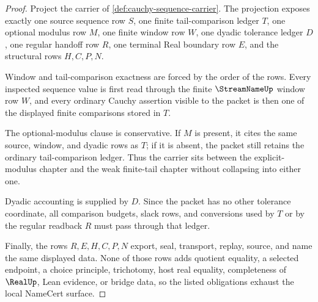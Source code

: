 \begin{proof}
Project the carrier of \autoref{def:cauchy-sequence-carrier}. The projection exposes exactly one source sequence row $S$, one finite tail-comparison ledger $T$, one optional modulus row $M$, one finite window row $W$, one dyadic tolerance ledger $D$, one regular handoff row $R$, one terminal Real boundary row $E$, and the structural rows $H,C,P,N$.

Window and tail-comparison exactness are forced by the order of the rows. Every inspected sequence value is first read through the finite $\StreamNameUp$ window row $W$, and every ordinary Cauchy assertion visible to the packet is then one of the displayed finite comparisons stored in $T$.

The optional-modulus clause is conservative. If $M$ is present, it cites the same source, window, and dyadic rows as $T$; if it is absent, the packet still retains the ordinary tail-comparison ledger. Thus the carrier sits between the explicit-modulus chapter and the weak finite-tail chapter without collapsing into either one.

Dyadic accounting is supplied by $D$. Since the packet has no other tolerance coordinate, all comparison budgets, slack rows, and conversions used by $T$ or by the regular readback $R$ must pass through that ledger.

Finally, the rows $R,E,H,C,P,N$ export, seal, transport, replay, source, and name the same displayed data. None of those rows adds quotient equality, a selected endpoint, a choice principle, trichotomy, host real equality, completeness of $\RealUp$, Lean evidence, or bridge data, so the listed obligations exhaust the local NameCert surface.
\end{proof}

